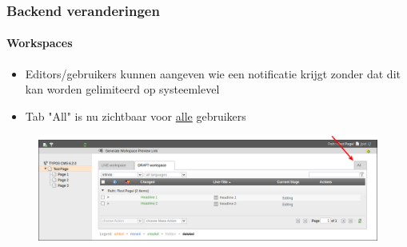 
\begin{frame}[fragile]
	\frametitle{Backend veranderingen}
	\framesubtitle{Workspaces}

 	\begin{itemize}
		\item Editors/gebruikers kunnen aangeven wie een notificatie krijgt \newline 
		zonder dat dit kan worden gelimiteerd op systeemlevel
		\item Tab "All" is nu zichtbaar voor \underline{alle} gebruikers
	\end{itemize}

	\begin{figure}
		\includegraphics[width=0.95\linewidth]{Images/BackendChanges/WorkspacesTabAll.png}
	\end{figure}

\end{frame}



